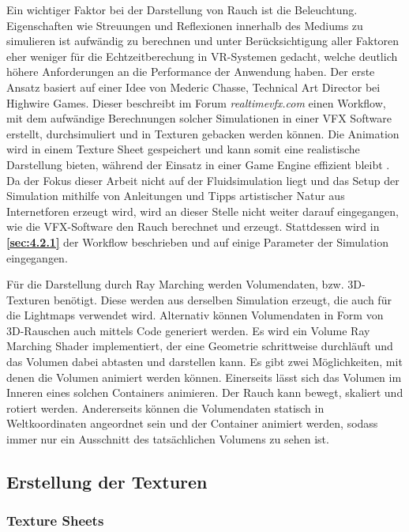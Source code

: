 Ein wichtiger Faktor bei der Darstellung von Rauch ist die Beleuchtung. Eigenschaften wie Streuungen und Reflexionen innerhalb des Mediums zu simulieren ist
aufwändig zu berechnen und unter Berücksichtigung aller Faktoren eher weniger für die Echtzeitberechung in VR-Systemen gedacht, welche deutlich höhere Anforderungen an die Performance der Anwendung
haben. Der erste Ansatz basiert auf einer Idee von Mederic Chasse, Technical Art Director  bei Highwire Games.
Dieser beschreibt im Forum \textit{realtimevfx.com} einen Workflow, mit dem aufwändige Berechnungen solcher Simulationen in einer VFX Software erstellt, durchsimuliert und in Texturen gebacken
werden können.
Die Animation wird in einem Texture Sheet gespeichert und kann somit eine realistische Darstellung bieten, während der Einsatz in einer Game Engine effizient bleibt \parencite{Chasse2018}.
Da der Fokus dieser Arbeit nicht auf der Fluidsimulation liegt und das Setup der Simulation mithilfe von Anleitungen
und Tipps artistischer Natur aus Internetforen erzeugt wird, wird an dieser Stelle nicht weiter darauf eingegangen, wie die VFX-Software den Rauch berechnet und erzeugt.
Stattdessen wird in \textbf{\autoref{sec:4.2.1}} der Workflow beschrieben und auf einige Parameter der Simulation eingegangen.

Für die Darstellung durch Ray Marching werden Volumendaten, bzw. 3D-Texturen benötigt. Diese werden aus derselben Simulation erzeugt, die auch für die Lightmaps verwendet wird.
Alternativ können Volumendaten in Form von 3D-Rauschen auch mittels Code generiert werden.
Es wird ein Volume Ray Marching Shader implementiert, der eine Geometrie schrittweise durchläuft und das Volumen dabei abtasten und darstellen kann.
Es gibt zwei Möglichkeiten, mit denen die Volumen animiert werden können. Einerseits lässt sich das Volumen im Inneren eines solchen Containers animieren.
Der Rauch kann bewegt, skaliert und rotiert werden. Andererseits können die Volumendaten statisch in Weltkoordinaten angeordnet sein und der Container
animiert werden, sodass immer nur ein Ausschnitt des tatsächlichen Volumens zu sehen ist.


\subsection{Erstellung der Texturen}
\label{sec:4.2}


\subsubsection{Texture Sheets}
\label{sec:4.2.1}

